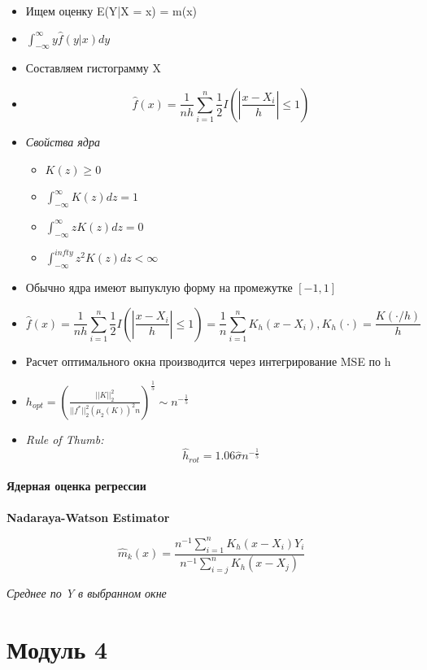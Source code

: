 \documentclass[a4paper, 12pt]{article}
\begin{document}
\begin{itemize}
    \item Ищем оценку E(Y|X = x) = m(x)
    \item $\int_{-\infty}^{\infty}y\hat{f}(y|x)dy$
    \item Составляем гистограмму X
    \item \[\hat{f}(x) = \frac{1}{nh}\sum_{i = 1}^{n}\frac{1}{2}I(\left|\frac{x - X_{i}}{h}\right| \leq 1)\]
    \item \textit{Свойства ядра}
    \begin{itemize}
        \item $K(z) \geq 0$
        \item $\int_{-\infty}^{\infty}K(z)dz = 1$
        \item $\int_{-\infty}^{\infty}zK(z)dz = 0$
        \item $\int_{-\infty}^{infty}z^{2}K(z)dz < \infty$
    \end{itemize}
    \item Обычно ядра имеют выпуклую форму на промежутке $[-1, 1]$
    \item \[\hat{f}(x) = \frac{1}{nh}\sum_{i = 1}^{n}\frac{1}{2}I(\left|\frac{x - X_{i}}{h}\right| \leq 1) = \frac{1}{n}\sum_{i = 1}^{n}K_{h}(x - X_{i}), K_{h}(\cdot) = \frac{K(\cdot / h)}{h}\]
    \item Расчет оптимального окна производится через интегрирование MSE по h
    \item $h_{opt} = \left(\frac{||K||^{2}_{2}}{||f^{*}||^{2}_{2}(\mu_{2}(K))^{2}n}\right)^{\frac{1}{5}} \sim n^{-\frac{1}{5}}$
    \item \textit{Rule of Thumb:}
    \[\hat{h}_{rot} = 1.06\hat{\sigma}n^{-\frac{1}{5}}\]
\end{itemize}

\subsection{Ядерная оценка регрессии}

\textbf{Nadaraya-Watson Estimator}

\[\hat{m}_{k}(x) = \frac{n^{-1}\sum_{i = 1}^{n}K_{h}(x - X_{i})Y_{i}}{n^{-1}\sum_{i = j}^{n}K_{h}(x - X_{j})}\]

\begin{center}
    \textit{Среднее по Y в выбранном окне}
\end{center}

\part{Модуль 4}
\end{document}
